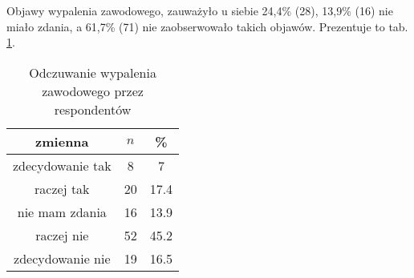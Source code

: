 Objawy wypalenia zawodowego, zauważyło u siebie 24,4\% (28), 13,9\% (16) nie miało zdania, a 61,7\% (71) nie zaobserwowało takich objawów. Prezentuje to tab. \ref{tab:Q35}.

\begin{table}[H]
\caption{Odczuwanie wypalenia zawodowego przez respondentów}
\centering
\begin{tabular}{ | c | c | c |}
\hline
zmienna & $n$ & \% \\
\hline
zdecydowanie tak  &  8  & 7 \\
\hline
raczej tak  &  20  & 17.4 \\
\hline
nie mam zdania  &  16  & 13.9 \\
\hline
raczej nie  &  52  & 45.2 \\
\hline
zdecydowanie nie  &  19  & 16.5\\
\hline
\end{tabular}
\label{tab:Q35}
\end{table}
